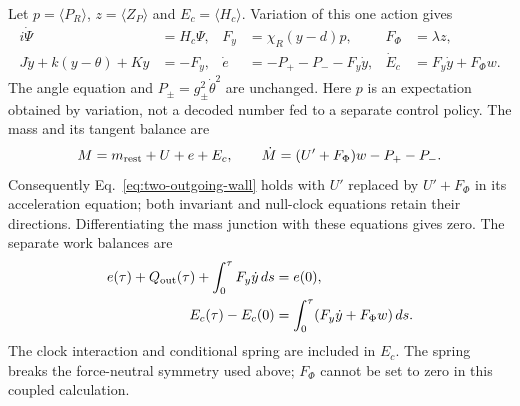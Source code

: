 \documentclass[12pt,a4paper]{article}
\begin{document}
Let $p=\langle P_R\rangle$, $z=\langle Z_P\rangle$ and
$E_c=\langle H_c\rangle$. Variation of this one action gives
\begin{align}\label{eq:record-spring-work}
 i\dot\Psi&=H_c\Psi,& F_y&=\chi_R(y-d)p,& F_\Phi&=\lambda z,\\
 J\ddot y+k(y-\theta)+Ky&=-F_y,&
 \dot e&=-P_+-P_--F_y\dot y,&
 \dot E_c&=F_y\dot y+F_\Phi w.\nonumber
\end{align}
The angle equation and $P_\pm=g_\pm^2\dot\theta^2$ are unchanged.
Here $p$ is an expectation obtained by variation, not a decoded number
fed to a separate control policy. The mass and its tangent balance are
\begin{equation}\label{eq:record-spring-mass}
 M=m_{\rm rest}+U+e+E_c,\qquad
 \dot M=(U'+F_\Phi)w-P_+-P_- .
\end{equation}
Consequently Eq.~\eqref{eq:two-outgoing-wall} holds with $U'$ replaced
by $U'+F_\Phi$ in its acceleration equation; both invariant and null-clock
equations retain their directions. Differentiating the mass junction
with these equations gives zero. The separate work balances are
\begin{align}\label{eq:record-spring-ledgers}
 e(\tau)+Q_{\rm out}(\tau)+\int_0^\tau F_y\dot y\,ds&=e(0),\\
 E_c(\tau)-E_c(0)&=\int_0^\tau(F_y\dot y+F_\Phi w)\,ds.\nonumber
\end{align}
The clock interaction and conditional spring are included in $E_c$.
The spring breaks the force-neutral symmetry used above; $F_\Phi$ cannot
be set to zero in this coupled calculation.
\end{document}
